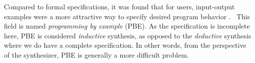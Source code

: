\documentclass{article}
\begin{document}





Compared to formal specifications, it was found that for users,
input-output examples were a more attractive way to specify desired program behavior%
.~\citep{bodik2013algorithmic}
This field is named \emph{programming by example} (PBE).
As the specification is incomplete here, PBE is considered \emph{inductive} synthesis, as opposed to the \emph{deductive} synthesis where we do have a complete specification.
In other words, from the perspective of the synthesizer, PBE is generally a more difficult problem.
\end{document}
